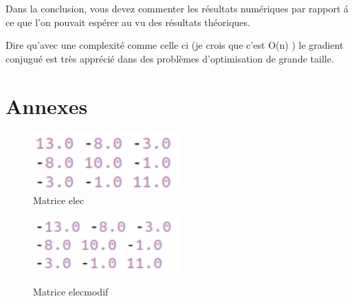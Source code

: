 \documentclass[12,french]{report}
\begin{document}
Dans la conclusion, vous devez commenter les résultats numériques par rapport á ce que l’on pouvait espérer au vu des résultats théoriques.

Dire qu'avec une complexité comme celle ci (je crois que c'est O(n) ) le gradient conjugué est très apprécié dans des problèmes d'optimisation de grande taille.

\chapter*{Annexes}
\begin{figure}[H]
    \begin{minipage}[c]{.46\linewidth}
        \centering
        \includegraphics[width=0.5\textwidth]{./Images/elec}\\
        \caption*{Matrice elec}
    \end{minipage}
    \hfill%
    \begin{minipage}[c]{.46\linewidth}
        \centering
        \includegraphics[width=0.5\textwidth]{./Images/elecmodif}\\
        \caption*{Matrice elecmodif}
    \end{minipage}
\end{figure}%
\end{document}
